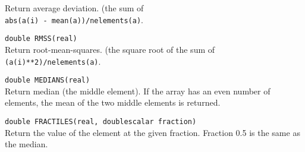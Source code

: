\begin{description}
    Return average deviation. (the sum of 
    \\\texttt{abs(a(i) - mean(a))/nelements(a)}.
  \item[] \texttt{double RMSS(real)}\\
    Return root-mean-squares. (the square root of the sum of
    \\\texttt{(a(i)**2)/nelements(a)}.
  \item[] \texttt{double MEDIANS(real)}\\
    Return median (the middle element).
    If the array has an even number of elements, the mean of
    the two middle elements is returned.
  \item[] \texttt{double FRACTILES(real, doublescalar fraction)}\\
    Return the value of the element at the given fraction.
    Fraction 0.5 is the same as the median.
\end{description}


